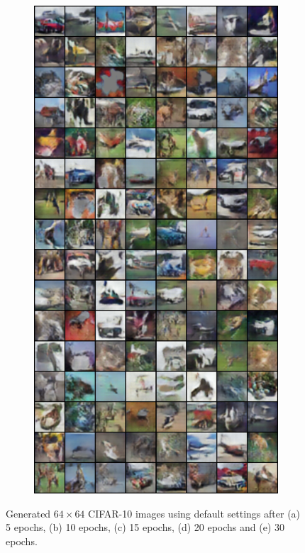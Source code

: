 \begin{figure}[H]
    \begin{subfigure}{0.2\textwidth}
        \centering
        \includegraphics[width=0.95\linewidth]{cifar10/64_nz100/fake_sample_epoch_0030.png}
        \caption{}
        \label{subfig:cifar10/64_nz100/fake_sample_epoch_0030}
    \end{subfigure}

    

    \caption{Generated $64 \times 64$ CIFAR-10 images using default settings after (a) 5 epochs, (b) 10 epochs, (c) 15 epochs, (d) 20 epochs and (e) 30 epochs.}
    \label{fig:cifar10_64_images}
\end{figure}

